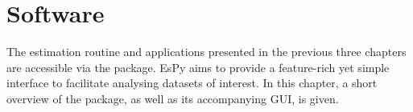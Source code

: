 \chapter{Software}
\label{chap:nmrespy}

The estimation routine and applications presented in the previous three
chapters are accessible via the  package. \ac{EsPy} aims to provide
a feature-rich yet simple interface to facilitate analysing datasets of
interest. In this chapter, a short overview of the package, as well as its
accompanying \ac{GUI}, is given.





